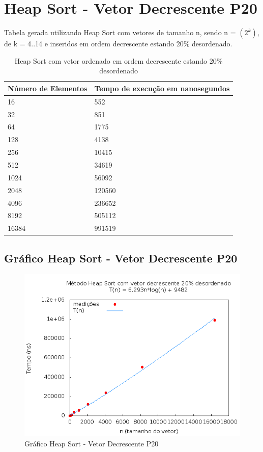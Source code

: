 \documentclass[12pt,a4paper,twoside]{report}
\begin{document}
\section{Heap Sort - Vetor Decrescente P20}
Tabela gerada utilizando Heap Sort com vetores de tamanho n, sendo n = $(2^k)$, de k = 4..14 e inseridos em ordem decrescente estando 20\% desordenado.
\begin{table}[H]
\centering
\caption{Heap Sort com vetor ordenado em ordem decrescente estando 20\% desordenado}
\label{my-label}
\begin{tabular}{|l|l|}
\hline
\multicolumn{1}{|c|}{\textbf{Número de Elementos}} & \multicolumn{1}{c|}{\textbf{Tempo de execução em nanosegundos}} \\ \hline
16 & 552 \\ \hline
32 & 851 \\ \hline
64 & 1775 \\ \hline
128 & 4138 \\ \hline
256 & 10415 \\ \hline
512 & 34619 \\ \hline
1024 & 56092 \\ \hline
2048 & 120560 \\ \hline
4096 & 236652 \\ \hline
8192 & 505112 \\ \hline
16384 & 991519 \\ \hline
\end{tabular}
\end{table}

\subsection{Gráfico Heap Sort - Vetor Decrescente P20}
\begin{figure}[H]
    \centering
    \includegraphics[width=0.7\linewidth]{graficos/HeapSort/vIntDecrescenteP20/vIntDecrescenteP20.png}
  \caption{Gráfico Heap Sort - Vetor Decrescente P20}
\end{figure}
\end{document}
